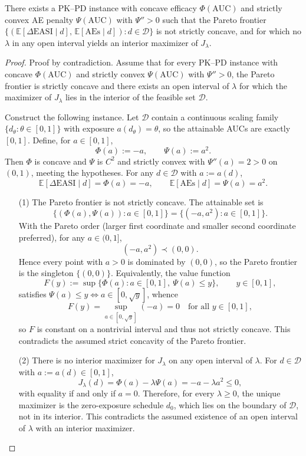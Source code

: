 ﻿\begin{theorem}\label{thm:pkpd-nonconcave-pareto}
There exists a PK--PD instance with concave efficacy \(\Phi(\mathrm{AUC})\) and strictly convex AE penalty \(\Psi(\mathrm{AUC})\) with \(\Psi''>0\) such that the Pareto frontier \(\{(\mathbb{E}[\Delta\mathrm{EASI}\mid d],\,\mathbb{E}[\mathrm{AEs}\mid d]) : d \in \mathcal{D}\}\) is not strictly concave, and for which no \(\lambda\) in any open interval yields an interior maximizer of \(J_\lambda\).
\end{theorem}
\begin{proof}
Proof by contradiction. Assume that for every PK--PD instance with concave \(\Phi(\mathrm{AUC})\) and strictly convex \(\Psi(\mathrm{AUC})\) with \(\Psi''>0\), the Pareto frontier is strictly concave and there exists an open interval of \(\lambda\) for which the maximizer of \(J_\lambda\) lies in the interior of the feasible set \(\mathcal{D}\).

Construct the following instance. Let \(\mathcal{D}\) contain a continuous scaling family \(\{d_\theta : \theta \in [0,1]\}\) with exposure \(a(d_\theta)=\theta\), so the attainable AUCs are exactly \([0,1]\). Define, for \(a\in[0,1]\),
\[
\Phi(a):=-a,\qquad \Psi(a):=a^2.
\]
Then \(\Phi\) is concave and \(\Psi\) is \(C^2\) and strictly convex with \(\Psi''(a)=2>0\) on \((0,1)\), meeting the hypotheses. For any \(d\in\mathcal{D}\) with \(a:=a(d)\),
\[
\mathbb{E}[\Delta\mathrm{EASI}\mid d]=\Phi(a)=-a,\qquad \mathbb{E}[\mathrm{AEs}\mid d]=\Psi(a)=a^2.
\]

\begin{enumerate}
\item[(1)] The Pareto frontier is not strictly concave. The attainable set is
\[
\{(\Phi(a),\Psi(a)) : a\in[0,1]\}=\{(-a,a^2): a\in[0,1]\}.
\]
With the Pareto order (larger first coordinate and smaller second coordinate preferred), for any \(a\in(0,1]\),
\[
(-a,a^2)\prec (0,0).
\]
Hence every point with \(a>0\) is dominated by \((0,0)\), so the Pareto frontier is the singleton \(\{(0,0)\}\). Equivalently, the value function
\[
F(y):=\sup\{\Phi(a): a\in[0,1],\ \Psi(a)\le y\},\qquad y\in[0,1],
\]
satisfies \(\Psi(a)\le y \iff a\in[0,\sqrt{y}]\), whence
\[
F(y)=\sup_{a\in[0,\sqrt{y}]}(-a)=0\quad\text{for all }y\in[0,1],
\]
so \(F\) is constant on a nontrivial interval and thus not strictly concave. This contradicts the assumed strict concavity of the Pareto frontier.

\item[(2)] There is no interior maximizer for \(J_\lambda\) on any open interval of \(\lambda\). For \(d\in\mathcal{D}\) with \(a:=a(d)\in[0,1]\),
\[
J_\lambda(d)=\Phi(a)-\lambda \Psi(a)=-a-\lambda a^2\le 0,
\]
with equality if and only if \(a=0\). Therefore, for every \(\lambda\ge 0\), the unique maximizer is the zero-exposure schedule \(d_0\), which lies on the boundary of \(\mathcal{D}\), not in its interior. This contradicts the assumed existence of an open interval of \(\lambda\) with an interior maximizer.
\end{enumerate}


\end{proof}

